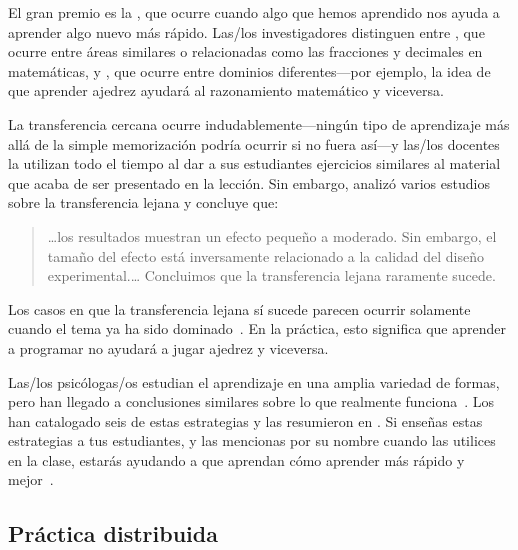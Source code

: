 El gran premio es la ,
que ocurre cuando algo que hemos aprendido nos ayuda a aprender algo nuevo más rápido.
Las/los investigadores distinguen entre ,
que ocurre entre áreas similares o relacionadas como las fracciones y decimales en matemáticas,
y ,
que ocurre entre dominios diferentes---por ejemplo,
la idea de que aprender ajedrez ayudará al razonamiento matemático y viceversa.

La transferencia cercana ocurre indudablemente---ningún tipo de aprendizaje
más allá de la simple memorización podría ocurrir si no fuera así---y
las/los docentes la utilizan todo el tiempo
al dar a sus estudiantes ejercicios similares al material que acaba de ser presentado en la lección.
Sin embargo,
\cite{Sala2017} analizó varios estudios sobre la transferencia lejana
y concluye que:

\begin{quote}

  {\ldots}los resultados muestran un efecto pequeño a moderado.
  Sin embargo, el tamaño del efecto está inversamente relacionado a la calidad del diseño experimental.{\ldots}
  Concluimos que la transferencia lejana raramente sucede.

\end{quote}

Los casos en que la transferencia lejana sí sucede
parecen ocurrir solamente cuando el tema ya ha sido dominado~\cite{Gick1987}.
En la práctica,
esto significa que aprender a programar no ayudará a jugar ajedrez y viceversa.


Las/los psicólogas/os estudian el aprendizaje en una amplia variedad de formas,
pero han llegado a conclusiones similares sobre lo que realmente funciona~\cite{Mark2018}.
Los 
han catalogado seis de estas estrategias y
las resumieron en .
Si enseñas estas estrategias a tus estudiantes,
y las mencionas por su nombre cuando las utilices en la clase,
estarás ayudando a que aprendan cómo aprender más rápido y mejor~\cite{Wein2018a,Wein2018b}.

\subsection*{Práctica distribuida}

